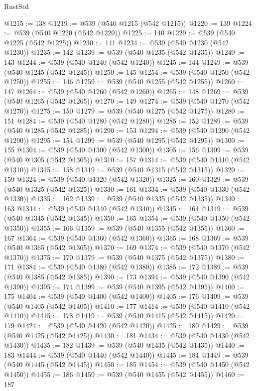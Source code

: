 \begin{lexlean}{RustStd}
\begin{coremodule}
{\begin{coremodule}
{{{{{{{{{{{{{{{{{{{{{{{{{{@1215 := 138
@1219 := @539 (@540 @1215 (@542 @1215))
@1220 := 139
@1224 := @539 (@540 @1220 (@542 @1220))
@1225 := 140
@1229 := @539 (@540 @1225 (@542 @1225))
@1230 := 141
@1234 := @539 (@540 @1230 (@542 @1230))
@1235 := 142
@1239 := @539 (@540 @1235 (@542 @1235))
@1240 := 143
@1244 := @539 (@540 @1240 (@542 @1240))
@1245 := 144
@1249 := @539 (@540 @1245 (@542 @1245))
@1250 := 145
@1254 := @539 (@540 @1250 (@542 @1250))
@1255 := 146
@1259 := @539 (@540 @1255 (@542 @1255))
@1260 := 147
@1264 := @539 (@540 @1260 (@542 @1260))
@1265 := 148
@1269 := @539 (@540 @1265 (@542 @1265))
@1270 := 149
@1274 := @539 (@540 @1270 (@542 @1270))
@1275 := 150
@1279 := @539 (@540 @1275 (@542 @1275))
@1280 := 151
@1284 := @539 (@540 @1280 (@542 @1280))
@1285 := 152
@1289 := @539 (@540 @1285 (@542 @1285))
@1290 := 153
@1294 := @539 (@540 @1290 (@542 @1290))
@1295 := 154
@1299 := @539 (@540 @1295 (@542 @1295))
@1300 := 155
@1304 := @539 (@540 @1300 (@542 @1300))
@1305 := 156
@1309 := @539 (@540 @1305 (@542 @1305))
@1310 := 157
@1314 := @539 (@540 @1310 (@542 @1310))
@1315 := 158
@1319 := @539 (@540 @1315 (@542 @1315))
@1320 := 159
@1324 := @539 (@540 @1320 (@542 @1320))
@1325 := 160
@1329 := @539 (@540 @1325 (@542 @1325))
@1330 := 161
@1334 := @539 (@540 @1330 (@542 @1330))
@1335 := 162
@1339 := @539 (@540 @1335 (@542 @1335))
@1340 := 163
@1344 := @539 (@540 @1340 (@542 @1340))
@1345 := 164
@1349 := @539 (@540 @1345 (@542 @1345))
@1350 := 165
@1354 := @539 (@540 @1350 (@542 @1350))
@1355 := 166
@1359 := @539 (@540 @1355 (@542 @1355))
@1360 := 167
@1364 := @539 (@540 @1360 (@542 @1360))
@1365 := 168
@1369 := @539 (@540 @1365 (@542 @1365))
@1370 := 169
@1374 := @539 (@540 @1370 (@542 @1370))
@1375 := 170
@1379 := @539 (@540 @1375 (@542 @1375))
@1380 := 171
@1384 := @539 (@540 @1380 (@542 @1380))
@1385 := 172
@1389 := @539 (@540 @1385 (@542 @1385))
@1390 := 173
@1394 := @539 (@540 @1390 (@542 @1390))
@1395 := 174
@1399 := @539 (@540 @1395 (@542 @1395))
@1400 := 175
@1404 := @539 (@540 @1400 (@542 @1400))
@1405 := 176
@1409 := @539 (@540 @1405 (@542 @1405))
@1410 := 177
@1414 := @539 (@540 @1410 (@542 @1410))
@1415 := 178
@1419 := @539 (@540 @1415 (@542 @1415))
@1420 := 179
@1424 := @539 (@540 @1420 (@542 @1420))
@1425 := 180
@1429 := @539 (@540 @1425 (@542 @1425))
@1430 := 181
@1434 := @539 (@540 @1430 (@542 @1430))
@1435 := 182
@1439 := @539 (@540 @1435 (@542 @1435))
@1440 := 183
@1444 := @539 (@540 @1440 (@542 @1440))
@1445 := 184
@1449 := @539 (@540 @1445 (@542 @1445))
@1450 := 185
@1454 := @539 (@540 @1450 (@542 @1450))
@1455 := 186
@1459 := @539 (@540 @1455 (@542 @1455))
@1460 := 187
}}}}}}}}}}}}}}}}}}}}}}}}}}
\end{coremodule}}
\end{coremodule}
\end{lexlean}
